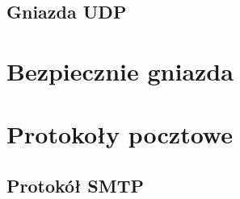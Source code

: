 \documentclass{article}
\begin{document}
\subsection*{Gniazda UDP}

\newpage
\section{Bezpiecznie gniazda}

\newpage
\section{Protokoły pocztowe}

\subsection*{Protokół SMTP}
\end{document}
